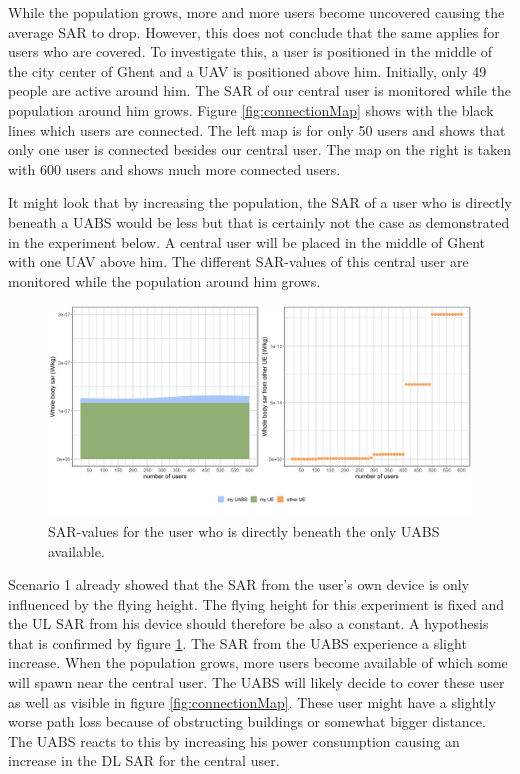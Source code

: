 While the population grows, more and more users become uncovered causing the average SAR to drop. However, this does not conclude that the same applies for 
users who are covered. To investigate this, a user is positioned in the middle of the city center of Ghent and a \gls{UAV} is positioned above him. Initially, only 
49 people are active around him. The \gls{SAR} of our central user is monitored while the population around him grows.
Figure \ref{fig:connectionMap} shows with the black lines which users are connected. The left map is for only 50 users and 
shows that only one user is connected besides our central user. The map on the right is taken with 600 users and shows much more connected users.



It might look that by increasing the population, the SAR of a user who is directly beneath a \gls{UABS} would be less but that is 
certainly not the case as demonstrated in the experiment below. A central user will be placed in the middle of Ghent with one \gls{UAV} above him.
The different \gls{SAR}-values of this central user are monitored while the population around him grows.

\begin{figure}[h!]
\centering
  \includegraphics[width=\textwidth/6*5]{../results/s2/uvsulsarcentralUser.png}
  \caption{SAR-values for the user who is directly beneath the only UABS available.}
  \label{fig:uvsulsarcentralUsers}
\end{figure}

Scenario 1 already showed that the \gls{SAR} from the user's own device is only influenced by the flying height. 
The flying height for this experiment is fixed and the \gls{UL} \gls{SAR} from his device should therefore be also a constant. 
A hypothesis that is confirmed by figure \ref{fig:uvsulsarcentralUsers}.
The \gls{SAR} from the \gls{UABS} experience a slight  increase. When the population grows, more users become available 
of which some will spawn near the central user. The \gls{UABS} will likely decide to cover these user  as well as visible in figure \ref{fig:connectionMap}.
These user might have a slightly 
worse path loss because of obstructing buildings or somewhat bigger distance. The \gls{UABS} reacts to this by increasing 
his power consumption causing an increase in the \gls{DL} \gls{SAR} for the central user.

